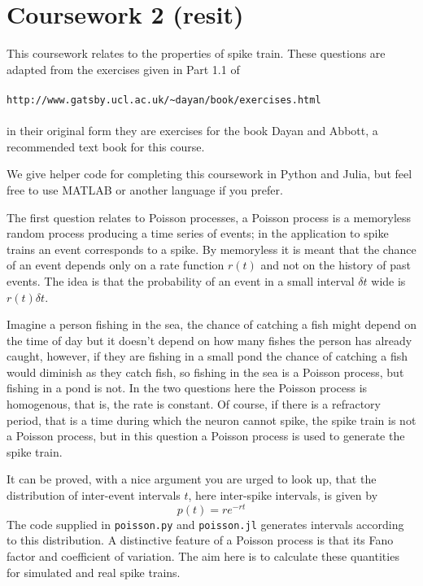 \documentclass[12pt]{article}
\begin{document}
\section*{Coursework 2 (resit)}

This coursework relates to the properties of spike train. These
questions are adapted from the exercises given in Part 1.1 of\\
\\
\texttt{http://www.gatsby.ucl.ac.uk/\~{}dayan/book/exercises.html}\\ 
\\
in their original form they are exercises for the book Dayan and Abbott,
a recommended text book for this course.

We give helper code for completing this coursework in Python and Julia, but feel free to use MATLAB or another language if you prefer.

The first question relates to Poisson processes, a Poisson process
is a memoryless random process producing a time series of events; in
the application to spike trains an event corresponds to a spike. By
memoryless it is meant that the chance of an event depends only on a
rate function $r(t)$ and not on the history of past events. The idea
is that the probability of an event in a small interval $\delta t$ wide is $r(t)\delta t$.

Imagine a person fishing in the sea, the chance of catching a fish
might depend on the time of day but it doesn't depend on how many
fishes the person has already caught, however, if they are fishing in
a small pond the chance of catching a fish would diminish as they
catch fish, so fishing in the sea is a Poisson process, but fishing in
a pond is not. In the two questions here the Poisson process is
homogenous, that is, the rate is constant. Of course, if there is a
refractory period, that is a time during which the neuron cannot
spike, the spike train is not a Poisson process, but in this question
a Poisson process is used to generate the spike train.

It can be proved, with a nice argument you are urged to look up, that
the distribution of inter-event intervals $t$, here inter-spike intervals,
is given by
\begin{equation}
p(t)=re^{-rt}
\end{equation}
The code supplied in \texttt{poisson.py} and \texttt{poisson.jl}
generates intervals according to this distribution. A distinctive
feature of a Poisson process is that its Fano factor and coefficient
of variation. The aim here is to calculate these quantities for
simulated and real spike trains.
\end{document}
